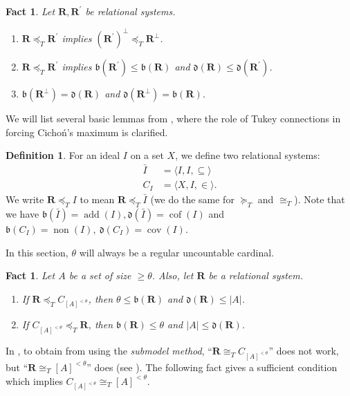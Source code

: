 \documentclass[a4paper,12pt]{amsart}
\newtheorem{fac}[thm]{Fact}
\theoremstyle{definition}
\newtheorem{dfn}[thm]{Definition}
\numberwithin{thm}{section}
\numberwithin{equation}{section}
\newcommand{\bb}{\mathfrak{b}}
\newcommand{\dd}{\mathfrak{d}}
\DeclareMathOperator{\non}{non}
\DeclareMathOperator{\cov}{cov}
\DeclareMathOperator{\add}{add}
\DeclareMathOperator{\cof}{cof}
\newcommand{\covi}{\cov(I)}
\newcommand{\noni}{\non(I)}
\newcommand{\addi}{\add(I)}
\newcommand{\cofi}{\cof(I)}
\newcommand{\R}{\mathbf{R}}
\renewcommand{\lq}{\preceq_T}
\begin{document}
    \begin{fac}\label{Tukey order and b and d}
        Let $\R, \R^\prime$ be relational systems.
    	\begin{enumerate}
    		\item $\R\preceq_T\R^{\prime}$ implies $(\R^{\prime})^\bot\preceq_T\R^\bot$.
    		\item $\R\preceq_T\R^{\prime}$ implies $\mathfrak{b}(\R^{\prime})\leq\mathfrak{b}(\R)$ and $\mathfrak{d}(\R)\leq\mathfrak{d}(\R^{\prime})$.
    		\item $\bb(\R^\bot)=\dd(\R)$ and $\dd(\R^\bot)=\bb(\R)$.
    	\end{enumerate}
    \end{fac}
    
    We will list several basic lemmas from \cite{CM22}, where the role of Tukey connections in forcing Cicho\'n's maximum is clarified.
    
    \begin{dfn} \label{dfn_RS}
    	For an ideal $I$ on a set $X$, we define two relational systems:
        \begin{align*}
            \bar{I} & = \langle I, I, \subseteq\rangle\\
                    C_I &=\langle X,I,\in\rangle.
        \end{align*}
    	We write $\R\lq I$ to mean $\R\lq\bar{I}$ (we do the same for $\succeq_T$ and $\cong_T$). 
        Note that we have $\bb(\bar{I})=\addi,\dd(\bar{I})=\cofi$ and $\bb(C_I)=\noni,~\dd(C_I)=\covi$.
    \end{dfn}
    
    In this section, $\theta$ will always be a regular uncountable cardinal.
    
    \begin{fac}\leavevmode
    	Let $A$ be a set of size $\geq\theta$. Also, let $\R$ be a relational system.
    	\begin{enumerate}
    		\item If $\R\lq C_{[A]^{<\theta}}$, then $\theta\leq\bb(\R)$ and $\dd(\R)\leq|A|$.
    		\item If $C_{[A]^{<\theta}}\lq \R$, then $\bb(\R)\leq\theta$ and $|A|\leq\dd(\R)$.
    	\end{enumerate}
    \end{fac}
    		
    In , 
    to obtain  from  using the \textit{submodel method}, 
    ``$\R\cong_T C_{[A]^{<\theta}}$'' does not work, but ``$\R\cong_T[A]^{<\theta}$'' does (see \cite{GKMS22}).
    The following fact gives a sufficient condition which implies $C_{[A]^{<\theta}}\cong_T [A]^{<\theta}$.
    
\end{document}
